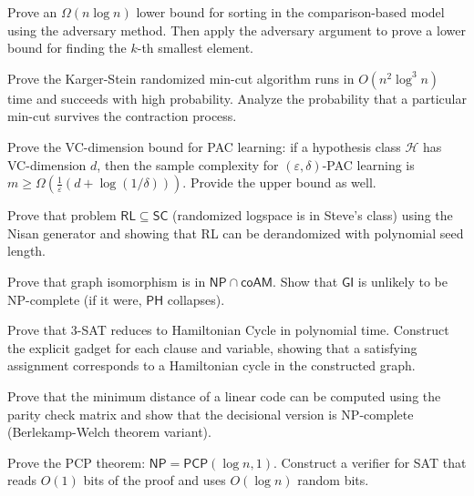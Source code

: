 \documentclass[12pt,a4paper]{exam}
\begin{document}
\begin{questions}
\vspace{0.3cm}

\question[3]
Prove an $\Omega(n \log n)$ lower bound for sorting in the comparison-based model using the adversary method. Then apply the adversary argument to prove a lower bound for finding the $k$-th smallest element.

\vspace{0.3cm}

\question[4]
Prove the Karger-Stein randomized min-cut algorithm runs in $O(n^2 \log^3 n)$ time and succeeds with high probability. Analyze the probability that a particular min-cut survives the contraction process.

\vspace{0.3cm}

\question[2]
Prove the VC-dimension bound for PAC learning: if a hypothesis class $\mathcal{H}$ has VC-dimension $d$, then the sample complexity for $(\varepsilon,\delta)$-PAC learning is $m \geq \Omega(\frac{1}{\varepsilon}(d + \log(1/\delta)))$. Provide the upper bound as well.

\vspace{0.3cm}

\question[7]
Prove that problem $\mathsf{RL} \subseteq \mathsf{SC}$ (randomized logspace is in Steve's class) using the Nisan generator and showing that RL can be derandomized with polynomial seed length.

\vspace{0.3cm}

\question[4]
Prove that graph isomorphism is in $\mathsf{NP} \cap \mathsf{coAM}$. Show that $\mathsf{GI}$ is unlikely to be NP-complete (if it were, $\mathsf{PH}$ collapses).

\vspace{0.3cm}

\question[5]
Prove that 3-SAT reduces to Hamiltonian Cycle in polynomial time. Construct the explicit gadget for each clause and variable, showing that a satisfying assignment corresponds to a Hamiltonian cycle in the constructed graph.

\vspace{0.3cm}

\question[2]
Prove that the minimum distance of a linear code can be computed using the parity check matrix and show that the decisional version is NP-complete (Berlekamp-Welch theorem variant).

\vspace{0.3cm}

\question[5]
Prove the PCP theorem: $\mathsf{NP} = \mathsf{PCP}(\log n, 1)$. Construct a verifier for SAT that reads $O(1)$ bits of the proof and uses $O(\log n)$ random bits.


\end{questions}
\end{document}
